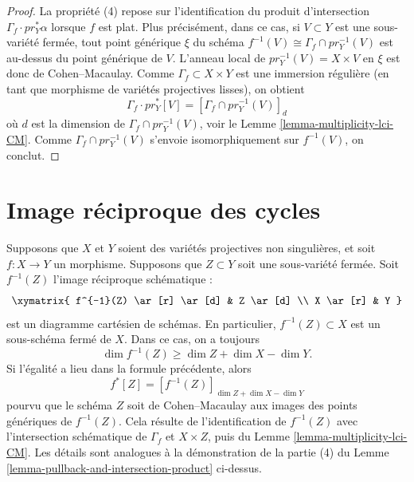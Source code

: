 \begin{proof}
\medskip\noindent
La propriété (4) repose sur l'identification du produit d'intersection
$\Gamma_f \cdot pr_Y^*\alpha$ lorsque $f$ est plat. Plus précisément, dans ce
cas, si $V \subset Y$ est une sous-variété fermée, tout point générique
$\xi$ du schéma $f^{-1}(V) \cong \Gamma_f \cap pr_Y^{-1}(V)$
est au-dessus du point générique de $V$. L'anneau local de
$pr_Y^{-1}(V) = X \times V$ en $\xi$ est donc de Cohen--Macaulay. Comme
$\Gamma_f \subset X \times Y$ est une immersion régulière (en tant que morphisme de
variétés projectives lisses), on obtient
$$
\Gamma_f \cdot pr_Y^*[V] = [\Gamma_f \cap pr_Y^{-1}(V)]_d
$$
où $d$ est la dimension de $\Gamma_f \cap pr_Y^{-1}(V)$, voir le
Lemme \ref{lemma-multiplicity-lci-CM}. Comme $\Gamma_f \cap pr_Y^{-1}(V)$
s'envoie isomorphiquement sur $f^{-1}(V)$, on conclut.
\end{proof}


\section{Image réciproque des cycles}
\label{section-pullback-cycles}

\noindent
Supposons que $X$ et $Y$ soient des variétés
projectives non singulières, et soit $f : X \to Y$ un morphisme.
Supposons que $Z \subset Y$ soit une sous-variété fermée. Soit $f^{-1}(Z)$
l'image réciproque schématique :
$$
\xymatrix{
f^{-1}(Z) \ar[r] \ar[d] & Z \ar[d] \\
X \ar[r] & Y
}
$$
est un diagramme cartésien de schémas. En particulier, $f^{-1}(Z) \subset X$
est un sous-schéma fermé de $X$. Dans ce cas, on a toujours
$$
\dim f^{-1}(Z) \geq \dim Z + \dim X - \dim Y.
$$
Si l'égalité a lieu dans la formule précédente, alors
\[f^*[Z] = [f^{-1}(Z)]_{\dim Z + \dim X - \dim Y}\]
pourvu que le schéma $Z$ soit de Cohen--Macaulay aux images
des points génériques de $f^{-1}(Z)$. Cela résulte de l'identification de
$f^{-1}(Z)$ avec l'intersection schématique de $\Gamma_f$
et $X \times Z$, puis du Lemme \ref{lemma-multiplicity-lci-CM}.
Les détails sont analogues à la démonstration de la partie (4) du
Lemme \ref{lemma-pullback-and-intersection-product} ci-dessus.











